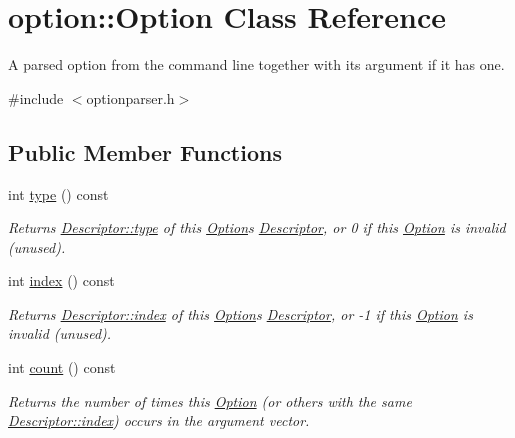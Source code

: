 \hypertarget{classoption_1_1_option}{}\section{option\+:\+:Option Class Reference}
\label{classoption_1_1_option}


A parsed option from the command line together with its argument if it has one.  




{\ttfamily \#include $<$optionparser.\+h$>$}

\subsection*{Public Member Functions}
\begin{DoxyCompactItemize}
\item 
int \hyperlink{classoption_1_1_option_a5268a69e1a91137186ab772574296da0}{type} () const
\begin{DoxyCompactList}\small\item\em Returns \hyperlink{structoption_1_1_descriptor_a1b220dabd8aad075fa441a80f9b9343c}{Descriptor\+::type} of this \hyperlink{classoption_1_1_option}{Option}\textquotesingle{}s \hyperlink{structoption_1_1_descriptor}{Descriptor}, or 0 if this \hyperlink{classoption_1_1_option}{Option} is invalid (unused). \end{DoxyCompactList}\item 
\mbox{\label{classoption_1_1_option_a847d12e8e76add769fbd01c703e48682}} 
int \hyperlink{classoption_1_1_option_a847d12e8e76add769fbd01c703e48682}{index} () const
\begin{DoxyCompactList}\small\item\em Returns \hyperlink{structoption_1_1_descriptor_a1fee8ac44f529c99ac2b1149b4c391b1}{Descriptor\+::index} of this \hyperlink{classoption_1_1_option}{Option}\textquotesingle{}s \hyperlink{structoption_1_1_descriptor}{Descriptor}, or -\/1 if this \hyperlink{classoption_1_1_option}{Option} is invalid (unused). \end{DoxyCompactList}\item 
int \hyperlink{classoption_1_1_option_ad26a118ffebde656fd82c06709086bed}{count} () const
\begin{DoxyCompactList}\small\item\em Returns the number of times this \hyperlink{classoption_1_1_option}{Option} (or others with the same \hyperlink{structoption_1_1_descriptor_a1fee8ac44f529c99ac2b1149b4c391b1}{Descriptor\+::index}) occurs in the argument vector. \end{DoxyCompactList}\item 

\end{DoxyCompactItemize}
